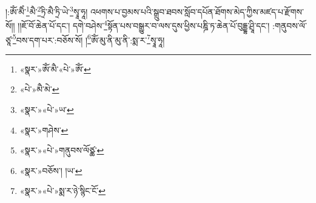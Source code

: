 །:ཨོཾ་མཻཾ་\footnote{«སྣར་»ཨོཾ་མཻ་«པེ་»ཨོཾ་}མཻ་\footnote{«པེ་»མཻ་མེ་}ཏྲི་མཻ་ཏྲི་ཡེ་\footnote{«སྣར་»«པེ་»ཡ་}སྭཱ་ཧཱ། འཕགས་པ་བྱམས་པའི་སྒྲུབ་ཐབས་སློབ་དཔོན་ཐོགས་མེད་ཀྱིས་མཛད་པ་རྫོགས་སོ།། །།ཇོ་བོ་ཆེན་པོ་དང་། དགེ་བཤེས་\footnote{«སྣར་»གཤེས་}སྟོན་པས་བསྒྱུར་བ་ལས་དུས་ཕྱིས་པཎྜི་ཏ་ཆེན་པོ་བུདྡྷ་ཤྲཱི་དང་། :གནུབས་ལོ་ཙཱ་\footnote{«སྣར་»«པེ་»གནུབས་ལོཙྪ་}བས་དག་པར་:བཅོས་སོ། །\footnote{«སྣར་»བཅོས་། །ཡ་}ཨོཾ་མུ་ནི་མུ་ནི་:སྨ་ར་\footnote{«སྣར་»«པེ་»སྨ་ར་ཉེ་སྙིང་ངོ་}སྭཱ་ཧཱ། 